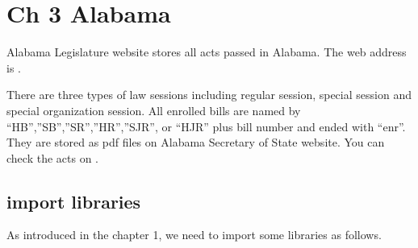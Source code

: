 \documentclass[letterpaper,10pt,english]{jupyterBook}
\begin{document}
\sphinxstepscope


\chapter{Ch 3 Alabama}
\label{\detokenize{ch3:ch-3-alabama}}\label{\detokenize{ch3::doc}}
\sphinxAtStartPar
Alabama Legislature website stores all acts passed in Alabama. The web address is .

\sphinxAtStartPar
{}

\sphinxAtStartPar
There are three types of law sessions including regular session, special session and special organization session. All enrolled bills are named by “HB”,”SB”,”SR”,”HR”,”SJR”, or “HJR” plus bill number and ended with “\sphinxhyphen{}enr”. They are stored as pdf files on Alabama Secretary of State website. You can check the acts on .


\section{import libraries}
\label{\detokenize{ch3:import-libraries}}
\sphinxAtStartPar
As introduced in the chapter 1, we need to import some libraries as follows.
\end{document}
